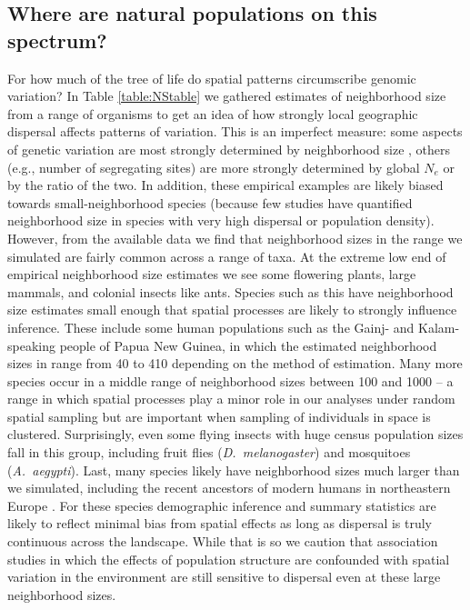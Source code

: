 \documentclass[10pt,twoside,lineno,hidelinks]{preprint}
\begin{document}
\subsection{Where are natural populations on this spectrum?}
For how much of the tree of life do spatial patterns circumscribe genomic variation?
In Table \ref{table:NStable} we gathered estimates of neighborhood size from a range of organisms
to get an idea of how strongly local geographic dispersal affects patterns of variation.
This is an imperfect measure:
some aspects of genetic variation are most strongly determined by neighborhood size \citep{Wright1946},
others (e.g., number of segregating sites)
are more strongly determined by global $N_e$ or by the ratio of the two.
In addition, these empirical examples are likely biased towards small-neighborhood species (because few studies have quantified neighborhood size in species with very high dispersal or population density). However, from the available data we find that neighborhood sizes in the range we simulated are fairly common across a range of taxa. At the extreme low end of empirical neighborhood size estimates we see some flowering plants, large mammals, and colonial insects like ants. Species such as this have neighborhood size estimates small enough that spatial processes are likely to strongly influence inference.
These include some human populations such as the Gainj- and Kalam-speaking people of Papua New Guinea, in which the estimated neighborhood sizes in \citet{Rousset1997} range from 40 to 410 depending on the method of estimation. 
Many more species occur in a middle range of neighborhood sizes between 100 and 1000 -- a range in which spatial processes play a minor role in our analyses under random spatial sampling but are important when sampling of individuals in space is clustered. Surprisingly, even some flying insects with huge census population sizes fall in this group, including fruit flies (\textit{D.~melanogaster}) and mosquitoes (\textit{A.~aegypti}). Last, many species likely have neighborhood sizes much larger than we simulated, including the recent ancestors of modern humans in northeastern Europe \citep{Ringbauer2017}. For these species demographic inference and summary statistics are likely to reflect minimal bias from spatial effects as long as dispersal is truly continuous across the landscape. While that is so we caution that association studies in which the effects of population structure are confounded with spatial variation in the environment are still sensitive to dispersal even at these large neighborhood sizes.
\end{document}
